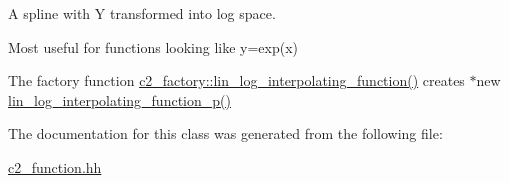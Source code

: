 A spline with Y transformed into log space.

Most useful for functions looking like y=exp(x) 

The factory function \hyperlink{classc2__factory_ab3e9ddf591f0cb2d327dc02c41836232}{c2\-\_\-factory\-::lin\-\_\-log\-\_\-interpolating\-\_\-function()} creates $\ast$new \hyperlink{classlin__log__interpolating__function__p_a461b4f4480a10a47e315dec7ff47bb4a}{lin\-\_\-log\-\_\-interpolating\-\_\-function\-\_\-p()} 

The documentation for this class was generated from the following file\-:\begin{DoxyCompactItemize}
\item 
\hyperlink{c2__function_8hh}{c2\-\_\-function.\-hh}\end{DoxyCompactItemize}
